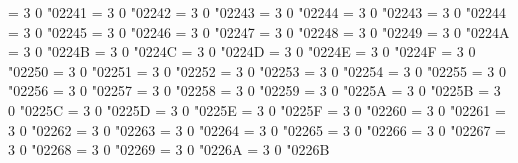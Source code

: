 \Umathchardef\nsim = 3 0 "02241 %
\Umathchardef\eqsim = 3 0 "02242 %
\Umathchardef\simeq = 3 0 "02243 %
\Umathchardef\nsime = 3 0 "02244 %
\Umathchardef\sime = 3 0 "02243 %
\Umathchardef\nsimeq = 3 0 "02244 %
\Umathchardef\cong = 3 0 "02245 %
\Umathchardef\simneqq = 3 0 "02246 %
\Umathchardef\ncong = 3 0 "02247 %
\Umathchardef\approx = 3 0 "02248 %
\Umathchardef\napprox = 3 0 "02249 %
\Umathchardef\approxeq = 3 0 "0224A %
\Umathchardef\approxident = 3 0 "0224B %
\Umathchardef\backcong = 3 0 "0224C %
\Umathchardef\asymp = 3 0 "0224D %
\Umathchardef\Bumpeq = 3 0 "0224E %
\Umathchardef\bumpeq = 3 0 "0224F %
\Umathchardef\doteq = 3 0 "02250 %
\Umathchardef\Doteq = 3 0 "02251 %
\Umathchardef\fallingdotseq = 3 0 "02252 %
\Umathchardef\risingdotseq = 3 0 "02253 %
\Umathchardef\coloneq = 3 0 "02254 %
\Umathchardef\eqcolon = 3 0 "02255 %
\Umathchardef\eqcirc = 3 0 "02256 %
\Umathchardef\circeq = 3 0 "02257 %
\Umathchardef\arceq = 3 0 "02258 %
\Umathchardef\wedgeq = 3 0 "02259 %
\Umathchardef\veeeq = 3 0 "0225A %
\Umathchardef\stareq = 3 0 "0225B %
\Umathchardef\triangleq = 3 0 "0225C %
\Umathchardef\eqdef = 3 0 "0225D %
\Umathchardef\measeq = 3 0 "0225E %
\Umathchardef\questeq = 3 0 "0225F %
\Umathchardef\ne = 3 0 "02260 %
\let\neq=\ne
\Umathchardef\equiv = 3 0 "02261 %
\Umathchardef\nequiv = 3 0 "02262 %
\Umathchardef\Equiv = 3 0 "02263 %
\Umathchardef\leq = 3 0 "02264 %
\let\le=\leq
\Umathchardef\geq = 3 0 "02265 %
\let\ge=\geq
\Umathchardef\leqq = 3 0 "02266 %
\Umathchardef\geqq = 3 0 "02267 %
\Umathchardef\lneqq = 3 0 "02268 %
\Umathchardef\gneqq = 3 0 "02269 %
\Umathchardef\ll = 3 0 "0226A %
\Umathchardef\gg = 3 0 "0226B %
